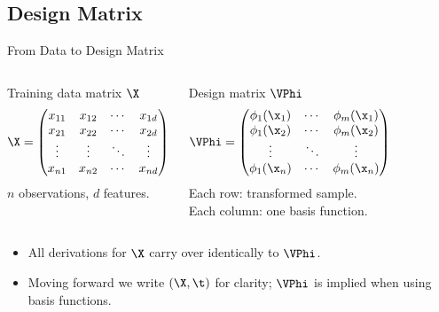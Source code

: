 \subsection{Design Matrix}

\begin{frame}{From Data to Design Matrix}
  \begin{columns}[T]
  \begin{block}{Training data matrix $\X$}
    \[
      \X = \begin{pmatrix}
        x_{11}&x_{12}&\cdots&x_{1d}\\
        x_{21}&x_{22}&\cdots&x_{2d}\\
        \vdots&\vdots&\ddots&\vdots\\
        x_{n1}&x_{n2}&\cdots&x_{nd}
      \end{pmatrix}
    \]
    $n$ observations, $d$ features.
  \end{block}
  \begin{block}{Design matrix $\VPhi$}
    \[
      \VPhi = \begin{pmatrix}
        \phi_1(\x_1)&\cdots&\phi_m(\x_1)\\
        \phi_1(\x_2)&\cdots&\phi_m(\x_2)\\
        \vdots&\ddots&\vdots\\
        \phi_1(\x_n)&\cdots&\phi_m(\x_n)
      \end{pmatrix}
    \]
    Each row: transformed sample.\\
    Each column: one basis function.
  \end{block}
  \end{columns}
  \vspace{.4em}
  \begin{itemize}
    \item All derivations for $\X$ carry over identically to $\VPhi$.
    \item Moving forward we write $(\X,\t)$ for clarity; $\VPhi$ is implied when using basis functions.
  \end{itemize}
\end{frame}

